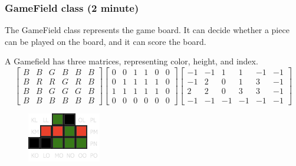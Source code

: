 \documentclass{beamer}
\begin{document}
\begin{frame}
\frametitle{GameField class (2 minute)}
The GameField class represents the game board. It can decide whether a piece can be played on the board, and it can score the board.

A Gamefield has three matrices, representing color, height, and index.
\tiny\[
  \begin{bmatrix}
    B & B & G & B & B & B \\ 
    B & R & R & G & R & B \\ 
    B & B & G & G & G & B \\ 
    B & B & B & B & B & B
  \end{bmatrix}
  \begin{bmatrix}
    0 & 0 & 1 & 1 & 0 & 0 \\ 
    0 & 1 & 1 & 1 & 1 & 0 \\ 
    1 & 1 & 1 & 1 & 1 & 0 \\ 
    0 & 0 & 0 & 0 & 0 & 0
  \end{bmatrix}
  \begin{bmatrix}
    -1 & -1 &  1 &  1 & -1 & -1 \\ 
    -1 &  2 &  0 &  1 &  3 & -1 \\ 
     2 &  2 &  0 &  3 &  3 & -1 \\ 
    -1 & -1 & -1 & -1 & -1 & -1
  \end{bmatrix}
\]
\begin{figure}
\includegraphics[width=0.4\linewidth]{3}
\end{figure}
\end{frame}
\end{document}
